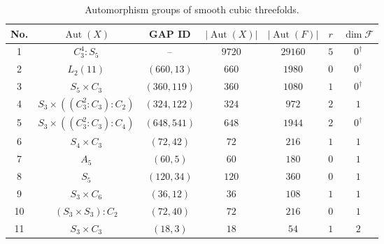 \documentclass[12pt]{amsart}
\numberwithin{equation}{section}
\theoremstyle{plain}
\theoremstyle{definition}
\theoremstyle{remark}
\DeclareMathOperator{\Aut}{Aut}
\begin{document}
{\scriptsize
\setlength{\tabcolsep}{2.5pt}
\begin{longtable}{|c|c|c|c|c|c|c|}
\caption{Automorphism groups of smooth cubic threefolds.}
\label{tab:threefold}\\
\hline
No. & $\Aut(X)$ & GAP ID & $|\Aut(X)|$ & $|\Aut(F)|$ & $r$ & $\dim\mathcal F$ \\ \hline
1  & $C_3^4:S_5$                         & --          & $9720$ & $29160$ & $5$ & $0^\dagger$ \\ \hline
2  & $L_2(11)$                            & $(660,13)$  & $660$  & $1980$  & $0$ & $0^\dagger$ \\ \hline
3  & $S_5\times C_3$                     & $(360,119)$ & $360$  & $1080$  & $1$ & $0^\dagger$ \\ \hline
4  & $S_3\times((C_3^2:C_3):C_2)$        & $(324,122)$ & $324$  & $972$   & $2$ & $1$ \\ \hline
5  & $S_3\times((C_3^2:C_3):C_4)$        & $(648,541)$ & $648$  & $1944$  & $2$ & $0^\dagger$ \\ \hline
6  & $S_4\times C_3$                     & $(72,42)$   & $72$   & $216$   & $1$ & $1$ \\ \hline
7  & $A_5$                                & $(60,5)$    & $60$   & $180$   & $0$ & $1$ \\ \hline
8  & $S_5$                                & $(120,34)$  & $120$  & $360$   & $0$ & $1$ \\ \hline
9  & $S_3\times C_6$                     & $(36,12)$   & $36$   & $108$   & $1$ & $1$ \\ \hline
10 & $(S_3\times S_3):C_2$               & $(72,40)$   & $72$   & $216$   & $0$ & $1$ \\ \hline
11 & $S_3\times C_3$                     & $(18,3)$    & $18$   & $54$    & $1$ & $2$ \\ \hline

\end{longtable}}
\end{document}
